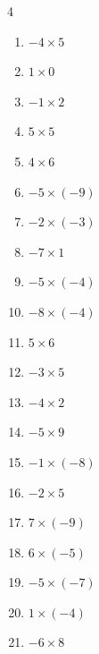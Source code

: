 \begin{multicols}{4}
\begin{enumerate}
  \item $-4\times 5$
        \phantom{$=-20$}

  \item $1\times 0$
        \phantom{$=0$}

  \item $-1\times 2$
        \phantom{$=-2$}

  \item $5\times 5$
        \phantom{$=25$}

  \item $4\times 6$
        \phantom{$=24$}

  \item $-5\times (-9)$
        \phantom{$=45$}

  \item $-2\times (-3)$
        \phantom{$=6$}

  \item $-7\times 1$
        \phantom{$=-7$}

  \item $-5\times (-4)$
        \phantom{$=20$}

  \item $-8\times (-4)$
        \phantom{$=32$}

  \item $5\times 6$
        \phantom{$=30$}

  \item $-3\times 5$
        \phantom{$=-15$}

  \item $-4\times 2$
        \phantom{$=-8$}

  \item $-5\times 9$
        \phantom{$=-45$}

  \item $-1\times (-8)$
        \phantom{$=8$}

  \item $-2\times 5$
        \phantom{$=-10$}

  \item $7\times (-9)$
        \phantom{$=-63$}

  \item $6\times (-5)$
        \phantom{$=-30$}

  \item $-5\times (-7)$
        \phantom{$=35$}

  \item $1\times (-4)$
        \phantom{$=-4$}

  \item $-6\times 8$
        \phantom{$=-48$}


\end{enumerate}
\end{multicols}
